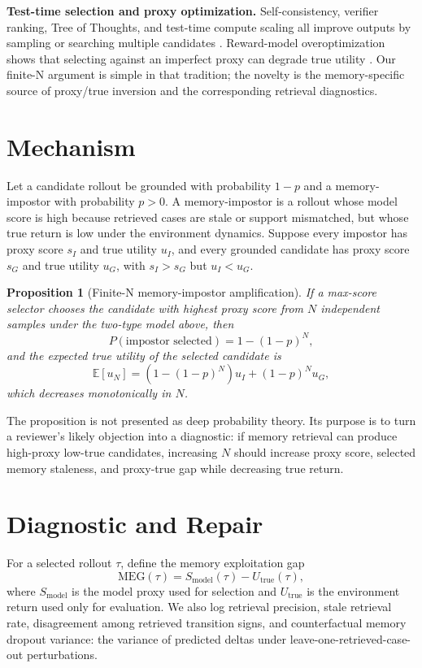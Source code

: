 \documentclass{article}
\newtheorem{proposition}{Proposition}
\newcommand{\meg}{\mathrm{MEG}}
\begin{document}
\textbf{Test-time selection and proxy optimization.}
Self-consistency, verifier ranking, Tree of Thoughts, and test-time compute
scaling all improve outputs by sampling or searching multiple candidates
\citep{wang2023selfconsistency,cobbe2021verifiers,yao2023tree,snell2024testtime}.
Reward-model overoptimization shows that selecting against an imperfect proxy can
degrade true utility \citep{gao2023reward}. Our finite-N argument is simple in
that tradition; the novelty is the memory-specific source of proxy/true
inversion and the corresponding retrieval diagnostics.

\section{Mechanism}

Let a candidate rollout be grounded with probability $1-p$ and a
memory-impostor with probability $p>0$. A memory-impostor is a rollout whose
model score is high because retrieved cases are stale or support mismatched, but
whose true return is low under the environment dynamics. Suppose every impostor
has proxy score $s_I$ and true utility $u_I$, and every grounded candidate has
proxy score $s_G$ and true utility $u_G$, with $s_I>s_G$ but $u_I<u_G$.

\begin{proposition}[Finite-N memory-impostor amplification]
If a max-score selector chooses the candidate with highest proxy score from $N$
independent samples under the two-type model above, then
\[
P(\text{impostor selected}) = 1-(1-p)^N,
\]
and the expected true utility of the selected candidate is
\[
\mathbb{E}[u_N] = \left(1-(1-p)^N\right)u_I + (1-p)^N u_G,
\]
which decreases monotonically in $N$.
\end{proposition}

The proposition is not presented as deep probability theory. Its purpose is to
turn a reviewer's likely objection into a diagnostic: if memory retrieval can
produce high-proxy low-true candidates, increasing $N$ should increase proxy
score, selected memory staleness, and proxy-true gap while decreasing true
return.

\section{Diagnostic and Repair}

For a selected rollout $\tau$, define the memory exploitation gap
\[
\meg(\tau) = S_\text{model}(\tau)-U_\text{true}(\tau),
\]
where $S_\text{model}$ is the model proxy used for selection and $U_\text{true}$
is the environment return used only for evaluation. We also log retrieval
precision, stale retrieval rate, disagreement among retrieved transition signs,
and counterfactual memory dropout variance: the variance of predicted deltas
under leave-one-retrieved-case-out perturbations.
\end{document}
